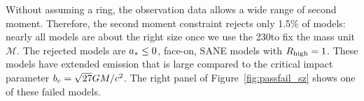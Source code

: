 

Without assuming a ring, the observation data allows a wide range of second moment.  Therefore, the second moment constraint rejects only 1.5\% of models: nearly all models are about the right size once we use the 230\GHz to fix the mass unit $\mathcal{M}$.  The rejected models are $a_* \le 0$, face-on, SANE models with $R_\mathrm{high} = 1$.  These models have extended emission that is large compared to the critical impact parameter $b_c = \sqrt{27} GM/c^2$.  The right panel of Figure~\ref{fig:passfail_sz} shows one of these failed models.

\label{sec:vam}


